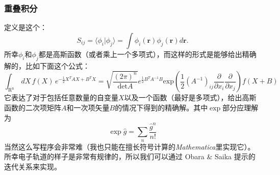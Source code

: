 \documentclass[12pt,a4paper,openany,twoside]{article}
\numberwithin{equation}{section}
\begin{document}
                \subsubsection{重叠积分}
                定义是这个：
                \begin{equation}
                    S_{ij} = \langle \phi_i | \phi_j \rangle = \int \phi_i(\boldsymbol{r}) \phi_j(\boldsymbol{r}) d \boldsymbol{r}.
                \end{equation}
                所幸$\phi_i$和$\phi_j$都是高斯函数（或者乘上一个多项式），而这样的形式是能够给出精确解的，比如下面这个公式：
                \begin{equation}
                    \int_\mathrm{R^n}\, dX \, f(X)\,e^{-\frac{1}{2}X^T A X + B^T X }= \sqrt{\frac{(2\pi)^n}{\mathrm{det} A}}e^{\frac{1}{2}B^T A^{-1}B} \mathrm{exp}\left(\frac{1}{2}(A^{-1})_{ij} \frac{\partial}{\partial x_i}\frac{\partial}{\partial x_j}\right) f(X+B)
                \end{equation}
                它表达了对于包括任意数量的自变量$X$以及一个函数（最好是多项式），给出高斯函数的二次项矩阵$A$和一次项矢量$B$的情况下得到的精确解。其中$\exp$部分应理解为
                \begin{equation}
                    \exp{\hat{g}} = \sum_n \frac{\hat{g}^n}{n!}
                \end{equation}
                当然这么写程序会非常难（我也只能在擅长符号计算的\emph{Mathematica}里实现它）。所幸电子轨道的样子是非常有规律的，所以我们可以通过 Obara \& Saika 提示的迭代关系来实现。
\end{document}

